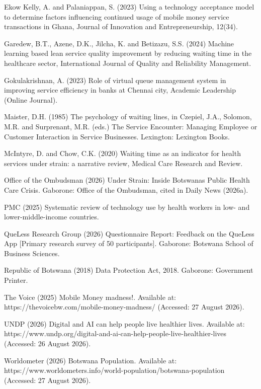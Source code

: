 \documentclass[
]{article}
\begin{document}
Ekow Kelly, A. and Palaniappan, S. (2023) \textquotesingle Using a
technology acceptance model to determine factors influencing continued
usage of mobile money service transactions in Ghana\textquotesingle,
Journal of Innovation and Entrepreneurship, 12(34).

Garedew, B.T., Azene, D.K., Jilcha, K. and Betizazu, S.S. (2024)
\textquotesingle Machine learning based lean service quality improvement
by reducing waiting time in the healthcare sector\textquotesingle,
International Journal of Quality and Reliability Management.

Gokulakrishnan, A. (2023) \textquotesingle Role of virtual queue
management system in improving service efficiency in banks at Chennai
city\textquotesingle, Academic Leadership (Online Journal).

Maister, D.H. (1985) \textquotesingle The psychology of waiting
lines\textquotesingle, in Czepiel, J.A., Solomon, M.R. and Surprenant,
M.R. (eds.) The Service Encounter: Managing Employee or Customer
Interaction in Service Businesses. Lexington: Lexington Books.

McIntyre, D. and Chow, C.K. (2020) \textquotesingle Waiting time as an
indicator for health services under strain: a narrative
review\textquotesingle, Medical Care Research and Review.

Office of the Ombudsman (2026) Under Strain: Inside
Botswana\textquotesingle s Public Health Care Crisis. Gaborone: Office
of the Ombudsman, cited in Daily News (2026a).

PMC (2025) Systematic review of technology use by health workers in low-
and lower-middle-income countries.

QueLess Research Group (2026) Questionnaire Report: Feedback on the
QueLess App {[}Primary research survey of 50 participants{]}. Gaborone:
Botswana School of Business Sciences.

Republic of Botswana (2018) Data Protection Act, 2018. Gaborone:
Government Printer.

The Voice (2025) \textquotesingle Mobile Money madness!\textquotesingle.
Available at: https://thevoicebw.com/mobile-money-madness/ (Accessed: 27
August 2026).

UNDP (2026) Digital and AI can help people live healthier lives.
Available at:
https://www.undp.org/digital-and-ai-can-help-people-live-healthier-lives
(Accessed: 26 August 2026).

Worldometer (2026) Botswana Population. Available at:
https://www.worldometers.info/world-population/botswana-population
(Accessed: 27 August 2026).
\end{document}
